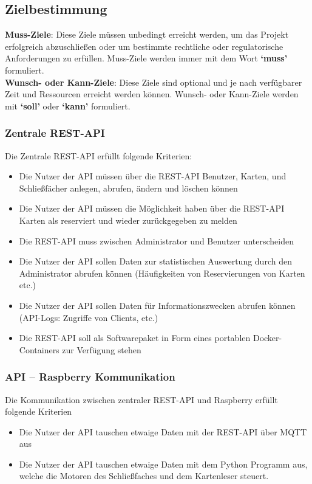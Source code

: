 \subsection{Zielbestimmung}
    \textbf{Muss-Ziele}: Diese Ziele müssen unbedingt erreicht werden, um das Projekt erfolgreich abzuschließen oder um bestimmte rechtliche oder regulatorische Anforderungen zu erfüllen. Muss-Ziele werden immer mit dem Wort \textbf{`muss'} formuliert.\\

    \textbf{Wunsch- oder Kann-Ziele}: Diese Ziele sind optional und je nach verfügbarer Zeit und Ressourcen erreicht werden können. Wunsch- oder Kann-Ziele werden mit \textbf{`soll'} oder \textbf{`kann'} formuliert.

\subsubsection{Zentrale REST-API}
Die Zentrale REST-API erfüllt folgende Kriterien:
\begin{itemize}
    \item Die Nutzer der API m\"ussen über die REST-API Benutzer, Karten, und Schlie\ss f\"acher anlegen, abrufen, ändern und löschen können
    \item Die Nutzer der API m\"ussen die Möglichkeit haben über die REST-API Karten als reserviert und wieder zurückgegeben zu melden
    
    \item Die REST-API muss zwischen Administrator und Benutzer unterscheiden

    \item Die Nutzer der API sollen Daten zur statistischen Auswertung durch den Administrator abrufen können (Häufigkeiten von Reservierungen von Karten etc.)

    \item Die Nutzer der API sollen Daten für Informationszwecken abrufen können (API-Logs: Zugriffe von Clients, etc.)

    \item Die REST-API soll als Softwarepaket in Form eines portablen Docker-Containers zur Verfügung stehen

\end{itemize}

\subsubsection{API -- Raspberry Kommunikation}
Die Kommunikation zwischen zentraler REST-API und Raspberry erfüllt folgende Kriterien 
\begin{itemize}
    \item Die Nutzer der API tauschen etwaige Daten mit der REST-API über MQTT aus
    \item Die Nutzer der API tauschen etwaige Daten mit dem Python Programm aus, welche die Motoren des Schließfaches und dem Kartenleser steuert.
\end{itemize}


